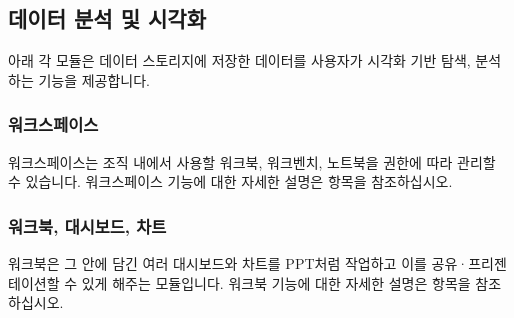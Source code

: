 \documentclass[letterpaper,10pt,english]{sphinxmanual}
\begin{document}
\subsection{데이터 분석 및 시각화}
\label{\detokenize{discovery/part01/structure:id3}}
아래 각 모듈은 데이터 스토리지에 저장한 데이터를 사용자가 시각화 기반 탐색, 분석하는 기능을 제공합니다.


\subsubsection{워크스페이스}
\label{\detokenize{discovery/part01/structure:id4}}
워크스페이스는 조직 내에서 사용할 워크북, 워크벤치, 노트북을 권한에 따라 관리할 수 있습니다. 워크스페이스 기능에 대한 자세한 설명은 {\hyperref[\detokenize{discovery/part03/index::doc}]{}} 항목을 참조하십시오.
\begin{quote}

\begin{figure}[H]
\centering

\noindent{}
\end{figure}
\end{quote}


\subsubsection{워크북, 대시보드, 차트}
\label{\detokenize{discovery/part01/structure:id5}}
워크북은 그 안에 담긴 여러 대시보드와 차트를 PPT처럼 작업하고 이를 공유·프리젠테이션할 수 있게 해주는 모듈입니다. 워크북 기능에 대한 자세한 설명은 {\hyperref[\detokenize{discovery/part04/index::doc}]{}} 항목을 참조하십시오.
\begin{quote}

\begin{figure}[H]
\centering

\noindent{}
\end{figure}

\begin{figure}[H]
\centering

\noindent{}
\end{figure}

\begin{figure}[H]
\centering

\noindent{}
\end{figure}
\end{quote}
\end{document}
